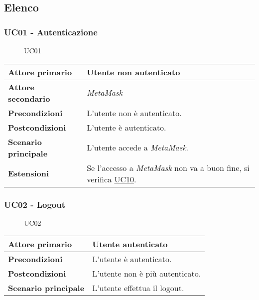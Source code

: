 \subsection{Elenco}

\subsubsection{UC01 - Autenticazione}
\label{UC01}

\begin{figure}[H]
    \centering
    
    \caption{UC01}
 \end{figure}

\begin{center}
\renewcommand{\arraystretch}{1.5}
\begin{tabular}{ | m{10em} | m{20em} | }
    \hline
    \textbf{Attore primario} & Utente non autenticato \\
    \hline
    \textbf{Attore secondario} & \textit{MetaMask} \\
    \hline
    \textbf{Precondizioni} & L'utente non è autenticato. \\
    \hline
    \textbf{Postcondizioni} & L'utente è autenticato. \\
    \hline
    \textbf{Scenario principale} & L'utente accede a \textit{MetaMask}. \\
    \hline
    \textbf{Estensioni} & Se l'accesso a \textit{MetaMask} non va a buon fine, si verifica \hyperref[UC10]{UC10}. \\
    \hline
   \end{tabular}
\end{center}

\subsubsection{UC02 - Logout}
\label{UC02}

\begin{figure}[H]
    \centering
    
    \caption{UC02}
 \end{figure}

\begin{center}
\renewcommand{\arraystretch}{1.5}
\begin{tabular}{ | m{10em} | m{20em} | }
    \hline
    \textbf{Attore primario} & Utente autenticato \\
    \hline
    \textbf{Precondizioni} & L'utente è autenticato. \\
    \hline
    \textbf{Postcondizioni} & L'utente non è più autenticato. \\
    \hline
    \textbf{Scenario principale} & L'utente effettua il logout. \\
    \hline
   \end{tabular}
\end{center}

